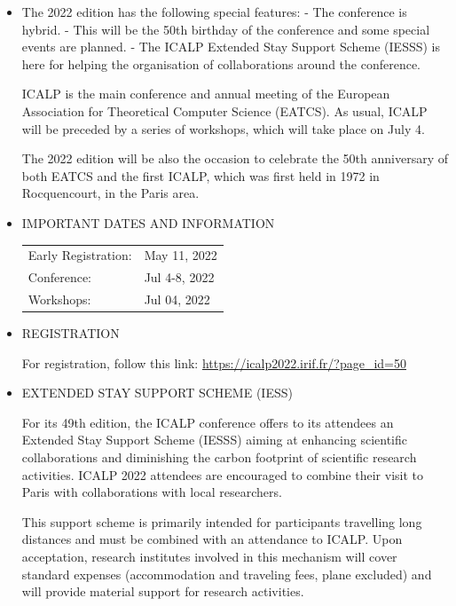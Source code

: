 \documentclass[prodmode,acmtecs]{acmsmall} %
\begin{document}
\begin{itemize}\item  The 2022 edition has the following special features: - The conference is hybrid. - This will be the 50th birthday of the conference and some special events are planned. - The ICALP Extended Stay Support Scheme (IESSS) is here for helping the organisation of collaborations around the conference. 
 
  ICALP is the main conference and annual meeting of the European Association for Theoretical Computer Science (EATCS). As usual, ICALP will be preceded by a series of workshops, which will take place on July 4. 
 
  The 2022 edition will be also the occasion to celebrate the 50th anniversary of both EATCS and the first ICALP, which was first held in 1972 in Rocquencourt, in the Paris area. 
 
\item  IMPORTANT DATES AND INFORMATION  
 
\begin{tabulary}{\linewidth}{LL}Early Registration:  & May 11, 2022 \\
Conference:  & Jul 4-8, 2022 \\
Workshops:  & Jul 04, 2022 \\
\end{tabulary}
 
\item  REGISTRATION  
 
  For registration, follow this link: \href{https://icalp2022.irif.fr/?page_id=50}{https://icalp2022.irif.fr/?page\_id=50} 
 
\item  EXTENDED STAY SUPPORT SCHEME (IESS)  
 
  For its 49th edition, the ICALP conference offers to its attendees an Extended Stay Support Scheme (IESSS) aiming at enhancing scientific collaborations and diminishing the carbon footprint of scientific research activities. ICALP 2022 attendees are encouraged to combine their visit to Paris with collaborations with local researchers. 
 
  This support scheme is primarily intended for participants travelling long distances and must be combined with an attendance to ICALP. Upon acceptation, research institutes involved in this mechanism will cover standard expenses (accommodation and traveling fees, plane excluded) and will provide material support for research activities. 
 

\end{itemize}
\end{document}

